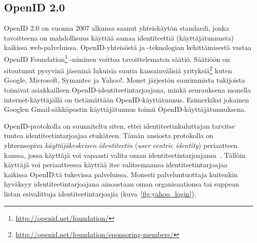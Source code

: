 \documentclass[finnish,gradu]{tktltiki}
\begin{document}


  \subsection{OpenID 2.0} %
  \label{sub:openid}



  OpenID 2.0 on vuonna 2007 alkunsa saanut yhteiskäytön standardi, jonka tavoitteena on mahdollisuus käyttää samaa identiteettiä (käyttäjätunnusta) kaikissa web-palveluissa. OpenID-yhteisöstä ja -teknologian kehittämisestä vastaa OpenID Foundation\footnote{\url{http://openid.net/foundation/}} -niminen voittoa tavoittelematon säätiö. Säätiöön on sitoutunut pysyvinä jäseninä lukuisia suuria kansainvälisiä yrityksiä\footnote{\url{http://openid.net/foundation/sponsoring-members/}} kuten Google, Microsoft, Symantec ja Yahoo!. Monet järjestön suurimmista tukijoista toimivat asiakkailleen OpenID-identiteetintarjoajana, minkä seurauksena monella internet-käyttäjällä on tietämättään OpenID-käyttätunnus. Esimerkiksi jokainen Googlen Gmail-sähköpostin käyttäjätunnus toimii  OpenID-käyttäjätunnuksena.

  OpenID-protokolla on suunniteltu siten, ettei identiteetinkuluttajan tarvitse tuntea identiteetintarjoajaa etukäteen. Tämän ansiosta protokolla on yhteensopiva \emph{käyttäjäkeskeisen identiteetin} (\emph{user centric identity}) periaatteen kanssa, jossa käyttäjä voi vapaasti valita oman identiteetintarjoajansa~\cite{openid_recordon_2009}. Tällöin käyttäjä voi periaatteessa käyttää itse valitsemaansa identiteetintarjoajaa kaikissa OpenID:tä tukevissa palveluissa.
  Monesti palveluntuottaja kuitenkin hyväksyy identiteetintarjoajana ainoastaan oman organisaationsa tai suppean listan esivalittuja identiteetintarjoajia (kuva~\ref{fig:yahoo_login}).
\end{document}
